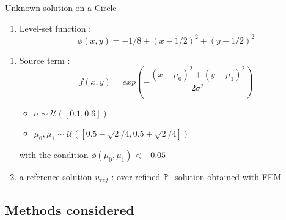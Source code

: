 \documentclass[compress,10pt,xcolor={table,dvipsnames},t]{beamer}
\begin{document}
	\begin{frame}{Unknown solution on a Circle}
		\begin{minipage}{0.3\linewidth}
			\centering
		\end{minipage} \;
		\begin{minipage}{0.68\linewidth}
			\begin{enumerate}[\ding{217}]
				\item Level-set function : 
				$$\phi(x,y)=-1/8+(x-1/2)^2+(y-1/2)^2$$
			\end{enumerate}
		\end{minipage}
		\begin{enumerate}[\ding{217}]
			\item Source term : 
			$$f(x,y) = exp\left(-\frac{(x-\mu_0)^2 + (y-\mu_1)^2}{2\sigma^2}\right)$$
			\begin{itemize}
				\item $\sigma \sim \mathcal{U}([0.1,0.6])$
				\item $\mu_0, \mu_1 \sim \mathcal{U}([0.5-\sqrt{2}/4, 0.5+\sqrt{2}/4])$ 
			\end{itemize}
			with the condition $\phi(\mu_0, \mu_1) < -0.05$
			\item a reference solution $u_{ref}$ : over-refined $\mathbb{P}^1$ solution obtained with FEM
		\end{enumerate}
	\end{frame}
	
	\subsection{Methods considered}
	
\end{document}
